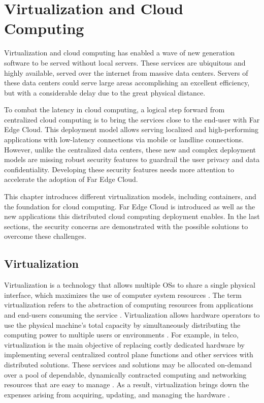 \chapter{Virtualization and Cloud Computing}
\label{chapter:cloudcomputing}

Virtualization and cloud computing has enabled a wave of new generation software to be served without local servers. These services are ubiquitous and highly available, served over the internet from massive data centers. Servers of these data centers could serve large areas accomplishing an excellent efficiency, but with a considerable delay due to the great physical distance.

To combat the latency in cloud computing, a logical step forward from centralized cloud computing is to bring the services close to the end-user with Far Edge Cloud. This deployment model allows serving localized and high-performing applications with low-latency connections via mobile or landline connections. However, unlike the centralized data centers, these new and complex deployment models are missing robust security features to guardrail the user privacy and data confidentiality. Developing these security features needs more attention to accelerate the adoption of Far Edge Cloud.

This chapter introduces different virtualization models, including containers, and the foundation for cloud computing. Far Edge Cloud is introduced as well as the new applications this distributed cloud computing deployment enables. In the last sections, the security concerns are demonstrated with the possible solutions to overcome these challenges.

\section{Virtualization}

Virtualization is a technology that allows multiple OSs to share a single physical interface, which maximizes the use of computer system resources \cite{Dong2012}. The term virtualization refers to the abstraction of computing resources from applications and end-users consuming the service \cite{Xing2012}. Virtualization allows hardware operators to use the physical machine's total capacity by simultaneously distributing the computing power to multiple users or environments \cite{RedHat}. For example, in telco, virtualization is the main objective of replacing costly dedicated hardware by implementing several centralized control plane functions and other services with distributed solutions. These services and solutions may be allocated on-demand over a pool of dependable, dynamically contracted computing and networking resources that are easy to manage \cite{Bosch2011}. As a result, virtualization brings down the expenses arising from acquiring, updating, and managing the hardware \cite{Lingayat2018}\cite{Toimela2017}.

